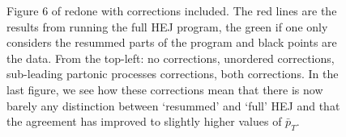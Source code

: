 \begin{figure}[H]
\caption{Figure 6 of \cite{Aad2011} redone with corrections included. The red lines are the results from running the full HEJ program, the green if one only considers the resummed parts of the program and black points are the data. From the top-left: no corrections, unordered corrections, sub-leading partonic processes corrections, both corrections. In the last figure, we see how these corrections mean that there is now barely any distinction between `resummed' and `full' HEJ and that the agreement has improved to slightly higher values of $\bar{p}_T$.}
\label{fig:veto}
\end{figure}

\begin{figure}[H]
\centering
{}

\end{figure}

